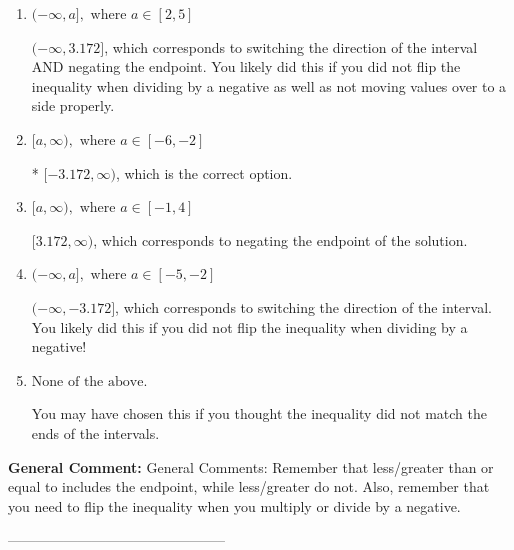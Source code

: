\documentclass{extbook}[14pt]
\begin{document}
\begin{enumerate}[label=\Alph*.] 
\item $ (-\infty, a], \text{ where } a \in [2, 5] $ 

  $(-\infty, 3.172]$, which corresponds to switching the direction of the interval AND negating the endpoint. You likely did this if you did not flip the inequality when dividing by a negative as well as not moving values over to a side properly. 
\item $ [a, \infty), \text{ where } a \in [-6, -2] $ 

 * $[-3.172, \infty)$, which is the correct option. 
\item $ [a, \infty), \text{ where } a \in [-1, 4] $ 

  $[3.172, \infty)$, which corresponds to negating the endpoint of the solution. 
\item $ (-\infty, a], \text{ where } a \in [-5, -2] $ 

  $(-\infty, -3.172]$, which corresponds to switching the direction of the interval. You likely did this if you did not flip the inequality when dividing by a negative! 
\item $ \text{None of the above}. $ 

 You may have chosen this if you thought the inequality did not match the ends of the intervals. 
\end{enumerate} 
 
\textbf{General Comment:} General Comments: Remember that less/greater than or equal to includes the endpoint, while less/greater do not. Also, remember that you need to flip the inequality when you multiply or divide by a negative. 

-----------------------------------------------
\end{document}
